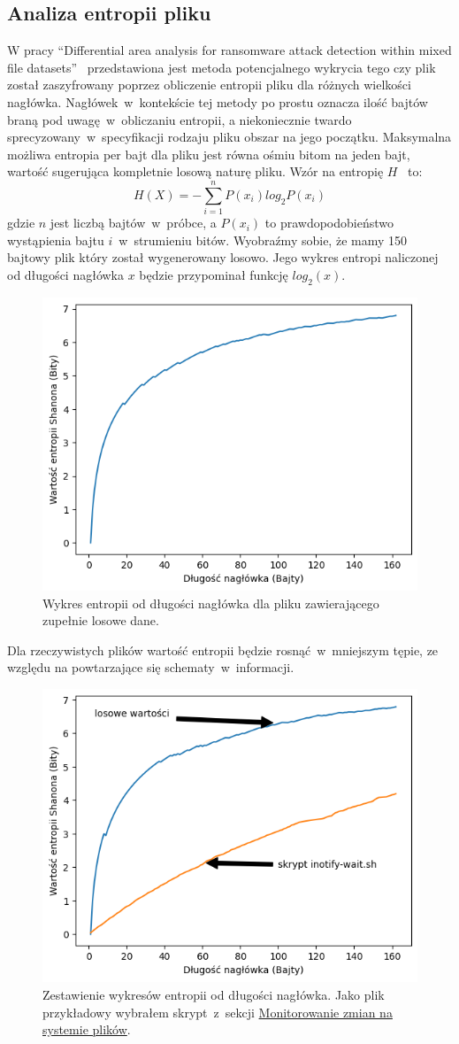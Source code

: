 \subsection{Analiza entropii pliku}
\label{sec:entropia}
W pracy \foreignquote{english}{Differential area analysis for ransomware
attack detection within mixed file datasets}~\cite{davies_differential_2021} przedstawiona jest 
metoda potencjalnego wykrycia tego czy plik został zaszyfrowany poprzez obliczenie entropii pliku dla różnych wielkości nagłówka.
Nagłówek~w~kontekście tej metody po prostu oznacza ilość bajtów braną pod uwagę~w~obliczaniu entropii, a niekoniecznie
twardo sprecyzowany~w~specyfikacji rodzaju pliku obszar na jego początku. Maksymalna możliwa entropia per bajt dla pliku jest równa ośmiu bitom na jeden bajt,
wartość sugerująca kompletnie losową naturę pliku. Wzór na entropię $H$~\cite{6773024} to:
$$
H(X) = - \sum_{i=1}^{n} P(x_{i})log_{2}P(x_{i})
$$
gdzie $n$ jest liczbą bajtów~w~próbce, a $P(x_{i})$ to prawdopodobieństwo wystąpienia bajtu $i$~w~strumieniu bitów.
Wyobraźmy sobie, że mamy 150 bajtowy plik który został wygenerowany losowo. Jego wykres entropi naliczonej 
od długości nagłówka $x$ będzie przypominał funkcję $log_{2}(x)$.
\begin{figure}[H]
    \centering
    \includegraphics[width=0.65\linewidth]{rysunki/randomy.png}
    \caption{Wykres entropii od długości nagłówka dla pliku zawierającego zupełnie losowe dane.}
    \label{fig:enter-label}
\end{figure}
Dla rzeczywistych plików wartość entropii będzie rosnąć~w~mniejszym tępie, ze względu na powtarzające
się schematy~w~informacji.
\begin{figure}[H]
    \centering
    \includegraphics[width=0.65\linewidth]{rysunki/zestawienie.png}
    \caption{Zestawienie wykresów entropii od długości nagłówka. Jako plik przykładowy wybrałem skrypt~z~sekcji \hyperref[sec:monitorowanie]{Monitorowanie zmian na systemie plików}.}
    \label{fig:enter-label}
\end{figure}
